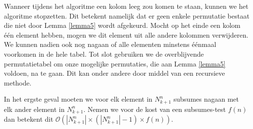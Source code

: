 \documentclass{article}
\begin{document}
Wanneer tijdens het algoritme een kolom leeg zou komen te staan, kunnen we het algoritme stopzetten.
Dit betekent namelijk dat er geen enkele permutatie bestaat die niet door Lemma \ref{lemma5} wordt afgekeurd.
Mocht op het einde een kolom \'e\'en element hebben, mogen we dit element uit alle andere kolommen verwijderen.
We kunnen nadien ook nog nagaan of alle elementen minstens \'e\'enmaal voorkomen in de hele tabel.
Tot slot gebruiken we de overblijvende permutatietabel om onze mogelijke permutaties, die aan Lemma \ref{lemma5} voldoen, na te gaan. 
Dit kan onder andere door middel van een recursieve methode.

In het ergste geval moeten we voor elk element in $N^n_{k+1}$ subsumes nagaan met elk ander element in $N^n_{k+1}$.
Nemen we voor de kost van een subsumes-test $f(n)$ dan betekent dit $\mathcal{O}\left(|N^n_{k+1}| \times \left(|N^n_{k+1}|-1\right) \times f(n) \right) $.
\end{document}
